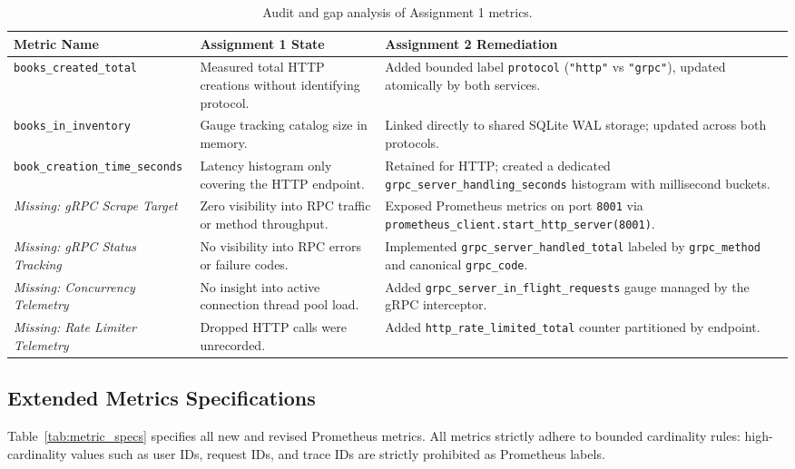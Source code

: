 \documentclass[11pt,a4paper]{article}
\begin{document}
\begin{table}[h!]
\centering
\small
\renewcommand{\arraystretch}{1.25}
\begin{tabularx}{\textwidth}{p{3.8cm} p{4.8cm} X}
\toprule
\textbf{Metric Name} & \textbf{Assignment 1 State} & \textbf{Assignment 2 Remediation} \\
\midrule
\texttt{books\_created\_total} & Measured total HTTP creations without identifying protocol. & Added bounded label \texttt{protocol} (\texttt{"http"} vs \texttt{"grpc"}), updated atomically by both services. \\
\texttt{books\_in\_inventory} & Gauge tracking catalog size in memory. & Linked directly to shared SQLite WAL storage; updated across both protocols. \\
\texttt{book\_creation\_time\_seconds} & Latency histogram only covering the HTTP endpoint. & Retained for HTTP; created a dedicated \texttt{grpc\_server\_handling\_seconds} histogram with millisecond buckets. \\
\textit{Missing: gRPC Scrape Target} & Zero visibility into RPC traffic or method throughput. & Exposed Prometheus metrics on port \texttt{8001} via \texttt{prometheus\_client.start\_http\_server(8001)}. \\
\textit{Missing: gRPC Status Tracking} & No visibility into RPC errors or failure codes. & Implemented \texttt{grpc\_server\_handled\_total} labeled by \texttt{grpc\_method} and canonical \texttt{grpc\_code}. \\
\textit{Missing: Concurrency Telemetry} & No insight into active connection thread pool load. & Added \texttt{grpc\_server\_in\_flight\_requests} gauge managed by the gRPC interceptor. \\
\textit{Missing: Rate Limiter Telemetry} & Dropped HTTP calls were unrecorded. & Added \texttt{http\_rate\_limited\_total} counter partitioned by endpoint. \\
\bottomrule
\end{tabularx}
\caption{Audit and gap analysis of Assignment 1 metrics.}
\label{tab:metrics_audit}
\end{table}

\subsection{Extended Metrics Specifications}
Table~\ref{tab:metric_specs} specifies all new and revised Prometheus metrics. All metrics strictly adhere to bounded cardinality rules: high-cardinality values such as user IDs, request IDs, and trace IDs are strictly prohibited as Prometheus labels.
\end{document}
